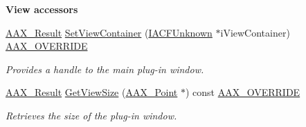 \begin{Indent}\textbf{ View accessors}\par
\begin{DoxyCompactItemize}
\item 
\mbox{\hyperlink{a00392_a4d8f69a697df7f70c3a8e9b8ee130d2f}{A\+A\+X\+\_\+\+Result}} \mbox{\hyperlink{a01477_a5ba8d0cf5326583ed9e2a4b9752e4287}{Set\+View\+Container}} (\mbox{\hyperlink{a01409}{I\+A\+C\+F\+Unknown}} $\ast$i\+View\+Container) \mbox{\hyperlink{a00392_ac2f24a5172689ae684344abdcce55463}{A\+A\+X\+\_\+\+O\+V\+E\+R\+R\+I\+DE}}
\begin{DoxyCompactList}\small\item\em Provides a handle to the main plug-\/in window. \end{DoxyCompactList}\item 
\mbox{\hyperlink{a00392_a4d8f69a697df7f70c3a8e9b8ee130d2f}{A\+A\+X\+\_\+\+Result}} \mbox{\hyperlink{a01477_a23c51648957128cf563b31e1a5fbc249}{Get\+View\+Size}} (\mbox{\hyperlink{a01609}{A\+A\+X\+\_\+\+Point}} $\ast$) const \mbox{\hyperlink{a00392_ac2f24a5172689ae684344abdcce55463}{A\+A\+X\+\_\+\+O\+V\+E\+R\+R\+I\+DE}}
\begin{DoxyCompactList}\small\item\em Retrieves the size of the plug-\/in window. \end{DoxyCompactList}\end{DoxyCompactItemize}
\end{Indent}
